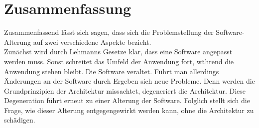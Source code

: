 \section{Zusammenfassung}
Zusammenfassend lässt sich sagen, dass sich die Problemstellung der Software-Alterung auf zwei verschiedene Aspekte bezieht.\\
Zunächst wird durch Lehmanns Gesetze klar, dass eine Software angepasst werden muss. Sonst schreitet das Umfeld der Anwendung fort, während die Anwendung stehen bleibt. Die Software veraltet. Führt man allerdings Änderungen an der Software durch Ergeben sich neue Probleme. Denn werden die Grundprinzipien der Architektur missachtet, degeneriert die Architektur. Diese Degeneration führt erneut zu einer Alterung der Software. Folglich stellt sich die Frage, wie dieser Alterung entgegengewirkt werden kann, ohne die Architektur zu schädigen.




